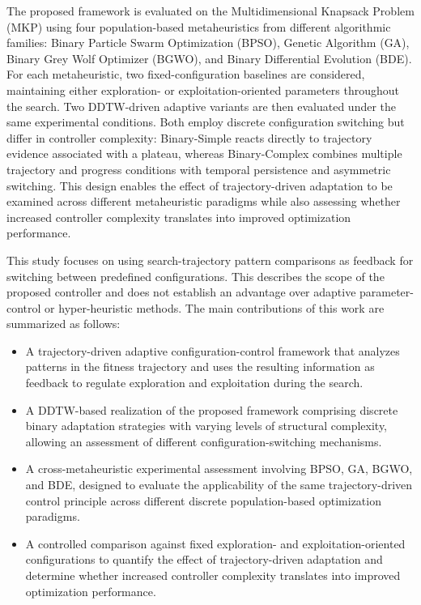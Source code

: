 \documentclass[journal,article,submit,moreauthors]{Definitions/mdpi}
\begin{document}
The proposed framework is evaluated on the Multidimensional Knapsack Problem
(MKP) using four population-based metaheuristics from different algorithmic
families: Binary Particle Swarm Optimization (BPSO), Genetic Algorithm (GA),
Binary Grey Wolf Optimizer (BGWO), and Binary Differential Evolution (BDE).
For each metaheuristic, two fixed-configuration baselines are considered,
maintaining either exploration- or exploitation-oriented parameters throughout
the search. Two DDTW-driven adaptive variants are then evaluated under the
same experimental conditions. Both employ discrete configuration switching
but differ in controller complexity: Binary-Simple reacts directly to
trajectory evidence associated with a plateau, whereas Binary-Complex
combines multiple trajectory and progress conditions with temporal
persistence and asymmetric switching. This design enables the effect of
trajectory-driven adaptation to be examined across different metaheuristic
paradigms while also assessing whether increased controller complexity
translates into improved optimization performance.

This study focuses on using search-trajectory pattern comparisons as feedback for switching between predefined configurations. This describes the scope of the proposed controller and does not establish an advantage over adaptive parameter-control or hyper-heuristic methods. The main contributions of this work are summarized as follows:

\begin{itemize}

\item A trajectory-driven adaptive configuration-control framework that analyzes patterns in the fitness trajectory and uses the resulting information as feedback to regulate exploration and exploitation during the search.

\item A DDTW-based realization of the proposed framework comprising discrete binary adaptation strategies with varying levels of structural complexity, allowing an assessment of different configuration-switching mechanisms.

\item A cross-metaheuristic experimental assessment involving BPSO, GA, BGWO, and BDE, designed to evaluate the applicability of the same trajectory-driven control principle across different discrete population-based optimization paradigms.

\item A controlled comparison against fixed exploration- and exploitation-oriented configurations to quantify the effect of trajectory-driven adaptation and determine whether increased controller complexity translates into improved optimization performance.
\end{itemize}
\end{document}
